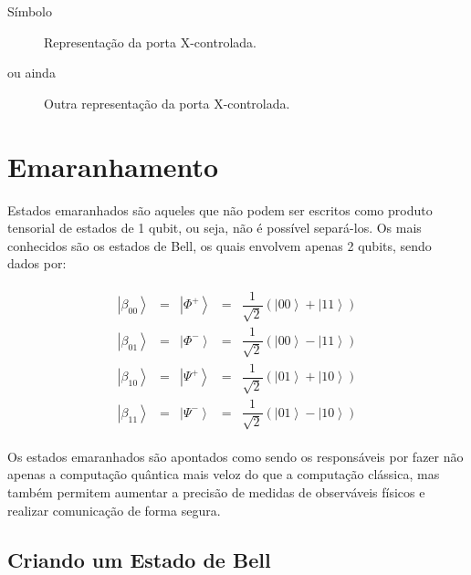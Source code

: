 Símbolo

\begin{figure}[!htp]
    \centering
    
    \caption{Representação da porta X-controlada.}
    \label{fig:cnot}
\end{figure}

ou ainda

\begin{figure}[!htp]
    \centering
    
    \caption{Outra representação da porta X-controlada.}
    \label{fig:cnot2}
\end{figure}


\section{Emaranhamento}\label{sec:emaranhamento}

Estados emaranhados são aqueles que não podem ser escritos como produto
tensorial de estados de 1 qubit, ou seja, não é possível separá-los.
Os mais conhecidos são os estados de Bell, os quais envolvem apenas 2
qubits, sendo dados por:

\[\begin{aligned}
\begin{matrix}
\left| \beta_{00} \right\rangle &=& \left| \Phi^+ \right\rangle &=& \dfrac{1}{\sqrt{2}} \left( \left| 00 \right\rangle + \left| 11 \right\rangle \right) \\
\left| \beta_{01} \right\rangle &=& \left| \Phi^- \right\rangle &=& \dfrac{1}{\sqrt{2}} \left( \left| 00 \right\rangle - \left| 11 \right\rangle \right) \\
\left| \beta_{10} \right\rangle &=& \left| \Psi^+ \right\rangle &=& \dfrac{1}{\sqrt{2}} \left( \left| 01 \right\rangle + \left| 10 \right\rangle \right) \\
\left| \beta_{11} \right\rangle &=& \left| \Psi^- \right\rangle &=& \dfrac{1}{\sqrt{2}} \left( \left| 01 \right\rangle - \left| 10 \right\rangle \right)
\end{matrix}
\end{aligned}\]

Os estados emaranhados são apontados como sendo os responsáveis por fazer
não apenas a computação quântica mais veloz do que a computação
clássica, mas também permitem aumentar a precisão de medidas de
observáveis físicos e realizar comunicação de forma segura.

\subsection{Criando um Estado de Bell}\label{subsec:criando-um-estado-de-bell}

